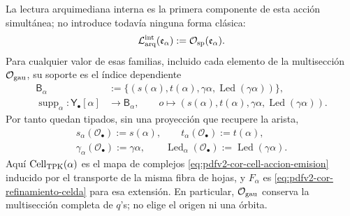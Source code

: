 La lectura arquimediana interna es la primera componente de esta acción
simultánea; no introduce todavía ninguna forma clásica:
\begin{equation}
\label{eq:continuo-lector-arquimediano}
 \mathcal L_{\rm arq}^{\rm int}(\mathfrak e_\alpha)
 :=\mathcal O_{\rm sp}(\mathfrak e_\alpha).
\end{equation}
Para cualquier valor de esas familias, incluido cada elemento de la
multisección \(\mathcal O_{\rm gau}\), su soporte es el índice dependiente
\begin{equation}
\label{eq:pdfv2-cor-soporte-dependiente}
 \begin{aligned}
 \mathsf B_\alpha&:=
 \{(s(\alpha),t(\alpha),\gamma\alpha,
          \operatorname{Led}(\gamma\alpha))\},\\
 \operatorname{supp}_\alpha:\mathsf Y_\bullet[\alpha]&\longrightarrow
 \mathsf B_\alpha,\qquad
 o\longmapsto(s(\alpha),t(\alpha),\gamma\alpha,
          \operatorname{Led}(\gamma\alpha)).
 \end{aligned}
\end{equation}
Por tanto quedan tipados, sin una proyección que recupere la arista,
\begin{equation}
\label{eq:pdfv2-cor-soporte-cinco-lecturas}
 \begin{gathered}
 s_\alpha(\mathcal O_\bullet):=s(\alpha),\qquad
 t_\alpha(\mathcal O_\bullet):=t(\alpha),\\
 \gamma_\alpha(\mathcal O_\bullet):=\gamma\alpha,
 \qquad
 \operatorname{Led}_\alpha(\mathcal O_\bullet)
 :=\operatorname{Led}(\gamma\alpha).
 \end{gathered}
\end{equation}
Aquí \(\operatorname{Cell}_{\rm TPK}(\alpha)\) es el mapa de complejos
\eqref{eq:pdfv2-cor-cell-accion-emision} inducido por el transporte de la
misma fibra de hojas, y \(F_\alpha\) es
\eqref{eq:pdfv2-cor-refinamiento-celda} para esa extensión. En particular,
\(\mathcal O_{\rm gau}\) conserva la multisección completa de \(q\)'s; no
elige el origen ni una órbita.

